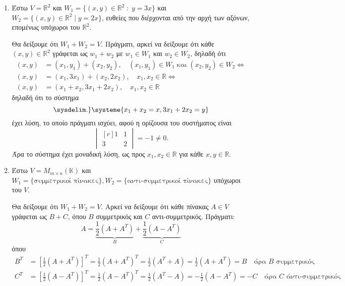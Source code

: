 \begin{examples}\label{ex:sums}
\item {}
    \begin{enumerate}
        \item \label{ex:r2} Έστω $ V = \mathbb{R}^{2} $ και $ W_{1} = 
            \{(x,y)\in \mathbb{R}^{2} \; : \; y =3x \} $ και 
            $ W_{2} = \{(x,y)\in \mathbb{R}^{2} \mid y=2x \} $, ευθείες που διέρχονται 
            από την αρχή των αξόνων, επομένως υπόχωροι του $ \mathbb{R}^{2}$. 

            Θα δείξουμε ότι $ W_{1}+W_{2} = V $. Πράγματι, αρκεί να δείξουμε ότι 
            κάθε $ (x,y) \in \mathbb{R}^{2} $ γράφεται ως $ w_{1}+w_{2} $ με 
            $ w_{1} \in W_{1} $ και $ w_{2} \in W_{2} $, δηλαδή ότι 
            \begin{align*}
                (x,y) &= (x_{1}, y_{1}) + (x_{2}, y_{2}), \quad (x_{1}, y_{1}) 
                \in W_{1} \; \text{και} \; (x_{2}, y_{2}) \in W_{2}
                \Leftrightarrow \\
                (x,y) &= (x_{1}, 3x_{1}) + (x_{2}, 2x_{2}), \quad x_{1}, x_{2} 
                \in \mathbb{R} \Leftrightarrow \\
                (x,y) &= (x_{1}+ x_{2}, 3x_{1}+ 2x_{2}), \quad x_{1}, x_{2} 
                \in \mathbb{R} 
            \end{align*}
            δηλαδή ότι το σύστημα 
            \[
            \sysdelim.\}\systeme{x_{1} + x_{2}=x,3x_{1} + 2x_{2}= y} 
        \] 
        έχει λύση, το οποίο πράγματι ισχύει, αφού η ορίζουσα του συστήματος είναι 
        \[
            \begin{vmatrix*}[r]
                1 & 1 \\
                3 & 2
            \end{vmatrix*} = -1 \neq 0.
        \]
        Άρα το σύστημα έχει μοναδική λύση, ως προς $ x_{1}, x_{2} \in \mathbb{R} $ 
        για κάθε $ x, y \in \mathbb{R} $.

    \item\label{ex:sym} Έστω $ V = M_{m \times n}(\mathbb{K}) $ και $ W_{1} = 
        \{ \text{συμμετρικοί πίνακες} \}, W_{2} = 
        \{ \text{αντι-συμμετρικοί πίνακες} \} $ υπόχωροι του $V$.

        Θα δείξουμε ότι $ W_{1}+W_{2}=V $. Αρκεί να δείξουμε ότι κάθε πίνακας 
        $ A \in V $ γράφεται ως $ B+C $, όπου $ B $ συμμετρικός και $ C $ 
        αντι-συμμετρικός. Πράγματι:
        \[
            A = \underbrace{\frac{1}{2} (A+A^{T})}_{B} + 
            \underbrace{\frac{1}{2} (A-A^{T})}_{C} 
        \] 
        όπου
        \begin{align*}
            B^{T} &= \left[\frac{1}{2} (A+A^{T})\right]^{T} = 
            \frac{1}{2} (A+A^{T})^{T} = \frac{1}{2} (A^{T}+A) = 
            \frac{1}{2} (A+A^{T}) = B \quad \text{άρα $B$ συμμετρικός} \\
            C^{T} &= \left[\frac{1}{2} (A-A^{T})\right]^{T} = 
            \frac{1}{2} (A-A^{T})^{T} = \frac{1}{2} (A^{T}-A) = - 
            \frac{1}{2} (A-A^{T}) = -C \quad \text{άρα $C$ άντι-συμμετρικός}
        \end{align*}


\end{enumerate}
\end{examples}
